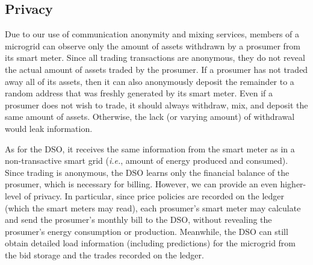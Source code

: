 
\subsection{Privacy}
Due to our use of communication anonymity and mixing services, members
of a microgrid can observe only the amount of assets withdrawn by a
prosumer from its smart meter.  Since all trading transactions are
anonymous, they do not reveal the actual amount of assets traded by
the prosumer.  If a prosumer has not traded away all of its assets,
then it can also anonymously deposit the remainder to a random address
that was freshly generated by its smart meter. Even if a prosumer does
not wish to trade, it should always withdraw, mix, and deposit the
same amount of assets.  Otherwise, the lack (or varying amount) of
withdrawal would leak information.

As for the DSO, it receives the same information from the smart meter
as in a non-transactive smart grid (\emph{i.e.}, amount of energy
produced and consumed).  Since trading is anonymous, the DSO learns
only the financial balance of the prosumer, which is necessary for
billing.  However, we can provide an even higher-level of privacy.  In
particular, since price policies are recorded on the ledger (which the
smart meters may read), each prosumer's smart meter may calculate and
send the prosumer's monthly bill to the DSO, without revealing the
prosumer's energy consumption or production.  Meanwhile, the DSO can
still obtain detailed load information (including predictions) for the
microgrid from the bid storage and the trades recorded on the ledger.


